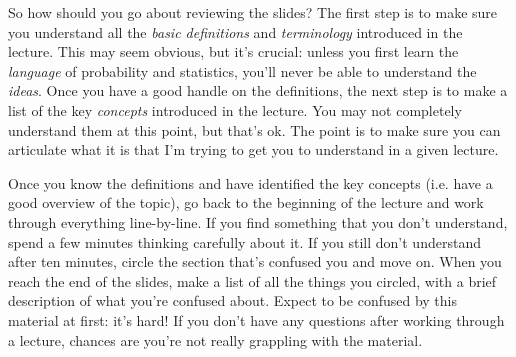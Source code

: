 \documentclass[12pt,letterpaper]{article}
\begin{document}
So how should you go about reviewing the slides? The first step is to make sure you understand all the \emph{basic definitions} and \emph{terminology} introduced in the lecture. This may seem obvious, but it's crucial: unless you first learn the \emph{language} of probability and statistics, you'll never be able to understand the \emph{ideas}. Once you have a good handle on the definitions, the next step is to make a list of the key \emph{concepts} introduced in the lecture. You may not completely understand them at this point, but that's ok. The point is to make sure you can articulate what it is that I'm trying to get you to understand in a given lecture. 

Once you know the definitions and have identified the key concepts (i.e. have a good overview of the topic), go back to the beginning of the lecture and work through everything line-by-line. If you find something that you don't understand, spend a few minutes thinking carefully about it. If you still don't understand after ten minutes, circle the section that's confused you and move on. When you reach the end of the slides, make a list of all the things you circled, with a brief description of what you're confused about. Expect to be confused by this material at first: it's hard! If you don't have any questions after working through a lecture, chances are you're not really grappling with the material.
\end{document}
